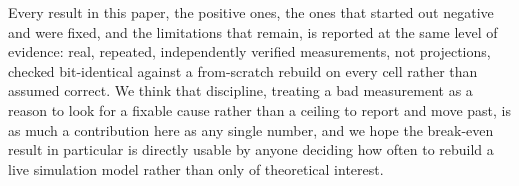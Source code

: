 \documentclass[journal]{IEEEtran}
\begin{document}
Every result in this paper, the positive ones, the ones that started out negative and were fixed, and the limitations that remain, is reported at the same level of evidence: real, repeated, independently verified measurements, not projections, checked bit-identical against a from-scratch rebuild on every cell rather than assumed correct. We think that discipline, treating a bad measurement as a reason to look for a fixable cause rather than a ceiling to report and move past, is as much a contribution here as any single number, and we hope the break-even result in particular is directly usable by anyone deciding how often to rebuild a live simulation model rather than only of theoretical interest.



\end{document}
